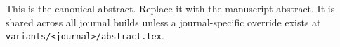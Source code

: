 This is the canonical abstract. Replace it with the manuscript abstract. It is shared
across all journal builds unless a journal-specific override exists at
\texttt{variants/<journal>/abstract.tex}.
